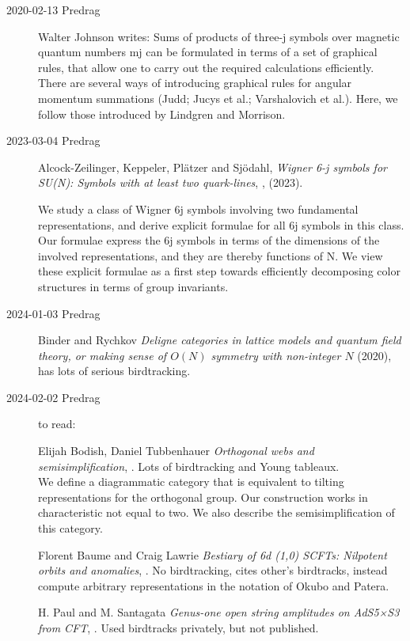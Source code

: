 \begin{description}
 \item[2020-02-13 Predrag]
  {Walter Johnson} writes:
Sums of products of three-j symbols over magnetic quantum numbers mj can
be formulated in terms of a set of graphical rules, that allow one to
carry out the required calculations efficiently. There are several ways
of introducing graphical rules for angular momentum summations
(Judd; Jucys et al.; Varshalovich et
al.). Here, we follow those introduced by Lindgren and
Morrison.

\item[2023-03-04 Predrag]
Alcock-Zeilinger, Keppeler, Pl{\"a}tzer and Sj{\"o}dahl,
{\em Wigner 6-j symbols for SU(N): {Symbols} with at least two quark-lines},
, (2023).

We study a class of  Wigner 6j symbols involving two fundamental
representations, and derive explicit formulae for all 6j symbols in this
class. Our formulae express the 6j symbols in terms of the dimensions of the
involved representations, and they are thereby functions of N. We view these
explicit formulae as a first step towards efficiently decomposing 
color structures in terms of group invariants.

\item[2024-01-03 Predrag]
Binder and Rychkov
{\em Deligne categories in lattice models and quantum field theory, or
making sense of {$O(N)$} symmetry with non-integer {$N$}}
(2020), has lots of serious birdtracking.

\item[2024-02-02 Predrag] to read:

Elijah Bodish, Daniel Tubbenhauer
{\em Orthogonal webs and semisimplification},
. Lots of birdtracking and Young tableaux.
\\
We define a diagrammatic category that is equivalent to tilting
representations for the orthogonal group. Our construction works in
characteristic not equal to two. We also describe the semisimplification
of this category.

Florent Baume and Craig Lawrie
{\em Bestiary of 6d (1,0) {SCFTs}: {Nilpotent} orbits and anomalies},
.
No birdtracking, cites other's birdtracks, instead compute arbitrary
representations in the notation of Okubo and
Patera.

H. Paul and M. Santagata
{\em Genus-one open string amplitudes on AdS5×S3 from CFT},
.
Used birdtracks privately, but not published.


\end{description}
